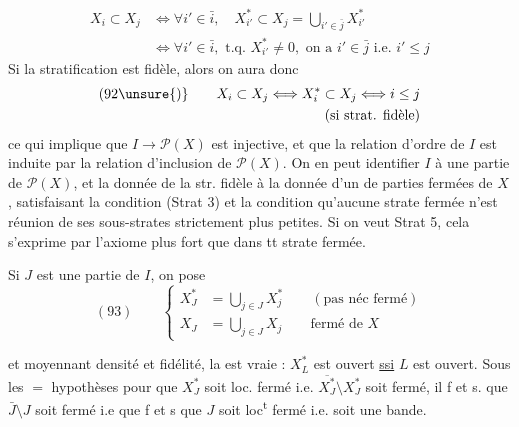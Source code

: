
\[
\begin{aligned}
X_i\subset X_j&\Longleftrightarrow\forall i'\in\bar i,\quad X_{i'}^*\subset X_j=\bigcup_{i'\in\bar j}X_{i'}^*\\
&\Longleftrightarrow\forall i'\in\bar i,\text{ t.q. }X_{i'}^*\neq0,\text{ on a }i'\in\bar j\text{ i.e. }i'\leq j
\end{aligned}
\]
Si la stratification est fidèle, alors on aura donc
\[
\begin{aligned}
(92\unsure{)}\qquad X_i\subset X_j\Longleftrightarrow X_i^*\subset X_j\Longleftrightarrow i\leq j&\\
(\text{si strat. fidèle})&
\end{aligned}
\]
ce qui implique que $I\longrightarrow\mathcal P(X)$ est injective, et que la relation d'ordre de $I$ est induite par la relation d'inclusion de $\mathcal P(X)$. On en peut identifier $I$ à une partie de $\mathcal P(X)$, et la donnée de la str. fidèle à la donnée d'un   de parties fermées  de $X$,  satisfaisant la condition (Strat 3)  et la condition qu'aucune strate fermée n'est réunion de ses sous-strates strictement plus petites. Si on veut Strat 5, cela s'exprime par l'axiome plus fort que dans tt strate fermée.

Si $J$ est une partie de $I$, on pose
\[
(93)\qquad\left\{
\begin{aligned}
X_J^*&=\bigcup_{j\in J}X_j^*\qquad(\text{pas néc fermé})\\
X_J&=\bigcup_{j\in J}X_j\qquad\text{fermé de }X
\end{aligned}\right.
\]


et moyennant densité et fidélité, la   est vraie : $X_L^*$ est ouvert \uline{ssi} $L$ est ouvert. Sous les $=$ hypothèses pour que $X_J^*$ soit loc. fermé i.e. $\overline{X_J^*}\setminus X_J^*$  soit fermé,  il f et s. que $\bar J\setminus J$ soit fermé i.e que f et s que $J$ soit loc\textsuperscript{t} fermé i.e. soit une bande.

